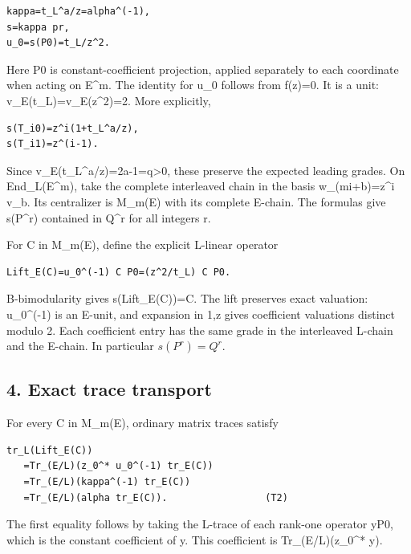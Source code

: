 \begin{Verbatim}[fontsize=\small,breaklines=true,breakanywhere=true]
kappa=t_L^a/z=alpha^(-1),
s=kappa pr,
u_0=s(P0)=t_L/z^2.
\end{Verbatim}

Here P0 is constant-coefficient projection, applied separately to each
coordinate when acting on E\^{}m. The identity for u\_0 follows from
f(z)=0. It is a unit: v\_E(t\_L)=v\_E(z\^{}2)=2. More explicitly,

\begin{Verbatim}[fontsize=\small,breaklines=true,breakanywhere=true]
s(T_i0)=z^i(1+t_L^a/z),
s(T_i1)=z^(i-1).
\end{Verbatim}

Since v\_E(t\_L\^{}a/z)=2a-1=q\textgreater0, these preserve the expected
leading grades. On End\_L(E\^{}m), take the complete interleaved chain
in the basis w\_(mi+b)=z\^{}i v\_b. Its centralizer is M\_m(E) with its
complete E-chain. The formulas give s(P\^{}r) contained in Q\^{}r for
all integers r.

For C in M\_m(E), define the explicit L-linear operator

\begin{Verbatim}[fontsize=\small,breaklines=true,breakanywhere=true]
Lift_E(C)=u_0^(-1) C P0=(z^2/t_L) C P0.
\end{Verbatim}

B-bimodularity gives s(Lift\_E(C))=C. The lift preserves exact
valuation: u\_0\^{}(-1) is an E-unit, and expansion in 1,z gives
coefficient valuations distinct modulo 2. Each coefficient entry has the
same grade in the interleaved L-chain and the E-chain. In particular
\(s(P^r)=Q^r\).

\hypertarget{dyadic_tower-exact-trace-transport}{%
\subsection{4. Exact trace transport}\label{dyadic_tower-exact-trace-transport}}

For every C in M\_m(E), ordinary matrix traces satisfy

\begin{Verbatim}[fontsize=\small,breaklines=true,breakanywhere=true]
tr_L(Lift_E(C))
   =Tr_(E/L)(z_0^* u_0^(-1) tr_E(C))
   =Tr_(E/L)(kappa^(-1) tr_E(C))
   =Tr_(E/L)(alpha tr_E(C)).                 (T2)
\end{Verbatim}

The first equality follows by taking the L-trace of each rank-one
operator yP0, which is the constant coefficient of y. This coefficient
is Tr\_(E/L)(z\_0\^{}* y).

